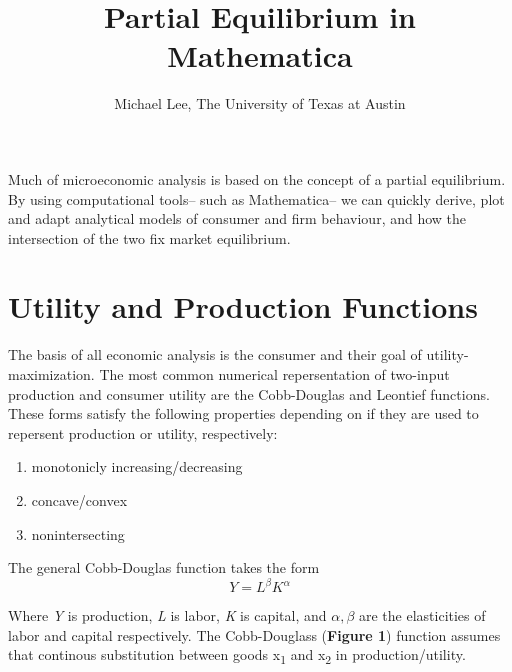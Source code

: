 \documentclass{article}
\title{Partial Equilibrium in Mathematica}
\author{Michael Lee, The University of Texas at Austin}
\begin{document}
\maketitle{}

Much of microeconomic analysis is based on the concept of a partial equilibrium. By using computational tools-- such as Mathematica-- we can quickly derive, plot and adapt analytical models of consumer and firm behaviour, and how the intersection of the two fix market equilibrium. 

\newpage

\section{Utility and Production Functions}

The basis of all economic analysis is the consumer and their goal of utility-maximization. The most common numerical repersentation of two-input production and consumer utility are the Cobb-Douglas and Leontief functions. These forms satisfy the following properties depending on if they are used to repersent production or utility, respectively:

\begin{center}
	\begin{enumerate}
		\item monotonicly increasing/decreasing
		\item concave/convex
		\item nonintersecting
	\end{enumerate}
\end{center}

The general Cobb-Douglas function takes the form
\begin{equation}
	Y = L^{\beta}K^{\alpha}
\end{equation}

Where \emph{Y} is production, \emph{L} is labor, \emph{K} is capital, and $\alpha , \beta$ are the elasticities of labor and capital respectively. The Cobb-Douglass ({\bf Figure 1}) function assumes that continous substitution between goods x\textsubscript{1} and x\textsubscript{2} in production/utility.
\end{document}
